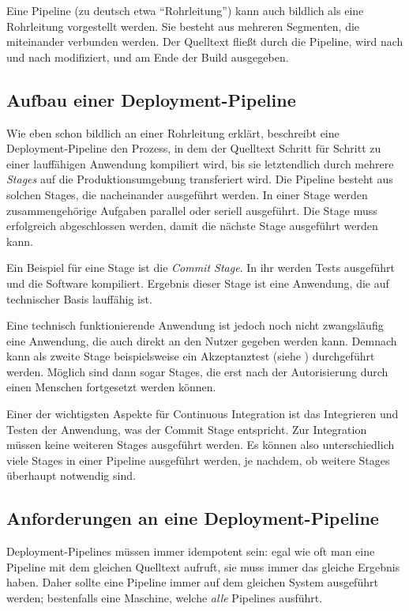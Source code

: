 Eine Pipeline (zu deutsch etwa ``Rohrleitung'') kann auch bildlich als eine Rohrleitung vorgestellt werden. Sie besteht aus mehreren Segmenten, die miteinander verbunden werden. Der Quelltext fließt durch die Pipeline, wird nach und nach modifiziert, und am Ende der Build ausgegeben.

\subsection{Aufbau einer Deployment-Pipeline}

Wie eben schon bildlich an einer Rohrleitung erklärt, beschreibt eine Deployment-Pipeline den Prozess, in dem der Quelltext Schritt für Schritt zu einer lauffähigen Anwendung kompiliert wird, bis sie letztendlich durch mehrere \emph{Stages} auf die Produktionsumgebung transferiert wird. Die Pipeline besteht aus solchen Stages, die nacheinander ausgeführt werden. In einer Stage werden zusammengehörige Aufgaben parallel oder seriell ausgeführt. Die Stage muss erfolgreich abgeschlossen werden, damit die nächste Stage ausgeführt werden kann.

Ein Beispiel für eine Stage ist die \emph{Commit Stage}. In ihr werden Tests ausgeführt und die Software kompiliert. Ergebnis dieser Stage ist eine Anwendung, die auf technischer Basis lauffähig ist. \citep[110]{Humble2010}

Eine technisch funktionierende Anwendung ist jedoch noch nicht zwangsläufig eine Anwendung, die auch direkt an den Nutzer gegeben werden kann. Demnach kann als zweite Stage beispielsweise ein Akzeptanztest (siehe ) durchgeführt werden. Möglich sind dann sogar Stages, die erst nach der Autorisierung durch einen Menschen fortgesetzt werden können. \citep{FowlerDP}

Einer der wichtigsten Aspekte für Continuous Integration ist das Integrieren und Testen der Anwendung, was der Commit Stage entspricht. Zur Integration müssen keine weiteren Stages ausgeführt werden. Es können also unterschiedlich viele Stages in einer Pipeline ausgeführt werden, je nachdem, ob weitere Stages überhaupt notwendig sind.

\subsection{Anforderungen an eine Deployment-Pipeline}

Deployment-Pipelines müssen immer idempotent sein: egal wie oft man eine Pipeline mit dem gleichen Quelltext aufruft, sie muss immer das gleiche Ergebnis haben. Daher sollte eine Pipeline immer auf dem gleichen System ausgeführt werden; bestenfalls eine Maschine, welche \emph{alle} Pipelines ausführt. \citep[155]{Humble2010}

